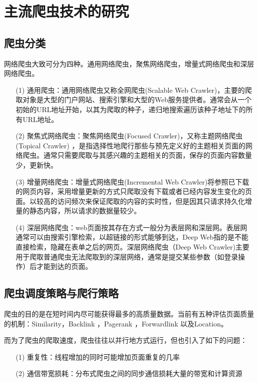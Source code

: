\documentclass[doctor,privacy,twoside]{buaa_mac}
\begin{document}
\chapter{主流爬虫技术的研究}

\section{爬虫分类}
网络爬虫大致可分为四种。通用网络爬虫，聚焦网络爬虫，增量式网络爬虫和深层网络爬虫。

\begin{itemize}
\item[(1)] 通用爬虫：通用网络爬虫又称全网爬虫(Scalable Web Crawler)，主要的爬取对象是大型的门户网站、搜索引擎和大型的Web服务提供者。通常会从一个初始的URL地址开始，以其为爬取的种子，递归地搜索遍历该种子地址下的所有URL地址。
\item[(2)] 聚焦式网络爬虫：聚焦网络爬虫(Focused Crawler)，又称主题网络爬虫(Topical Crawler)	，是指选择性地爬行那些与预先定义好的主题相关页面的网络爬虫。通常只需要爬取与其感兴趣的主题相关的页面，保存的页面内容数量少，更新快。
\item[(3)] 增量网络爬虫：增量式网络爬虫(Incremental Web Crawler)将参照已下载的网页内容，采用增量更新的方式只爬取没有下载或者已经内容发生变化的页面。以较高的访问频次来保证爬取的内容的实时性，但是因其只请求持久化增量的静态内容，所以请求的数据量较少。
\item[(4)] 深层网络爬虫：web页面按其存在方式一般分为表层网和深层网。表层网通常可以由搜索引擎检索，以超链接的形式能够到达，Deep Web指的是不能直接检索，隐藏在表单之后的网页。深层网络爬虫（Deep Web Crawler)主要用于爬取普通爬虫无法爬取到的深层网络，通常是提交某些参数（如登录操作）后才能到达的页面。
\end{itemize}




\section{爬虫调度策略与爬行策略}
爬虫的目的是在短时间内尽可能获得最多的高质量数据。当前有五种评估页面质量的机制：Similarity，Backlink ，Pagerank ，Forwardlink 以及Location。

而为了爬虫的爬取速度，爬虫往往以并行地方式运行，但也引入了如下的问题：

\begin{itemize}
\item[(1)] 重复性：线程增加的同时可能增加页面重复的几率
\item[(2)] 通信带宽损耗：分布式爬虫之间的同步通信损耗大量的带宽和计算资源
\end{itemize}
\end{document}
